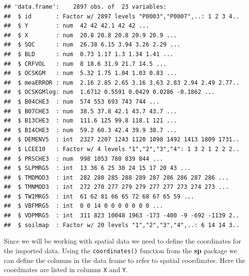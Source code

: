 \documentclass[10pt,b5paper,]{book}
\newenvironment{Shaded}{\begin{snugshade}}{\end{snugshade}}
\newcommand{\CommentTok}[1]{\textcolor[rgb]{0.56,0.35,0.01}{\textit{#1}}}
\newcommand{\KeywordTok}[1]{\textcolor[rgb]{0.13,0.29,0.53}{\textbf{#1}}}
\newcommand{\NormalTok}[1]{#1}
\newcommand{\OperatorTok}[1]{\textcolor[rgb]{0.81,0.36,0.00}{\textbf{#1}}}
\newcommand{\StringTok}[1]{\textcolor[rgb]{0.31,0.60,0.02}{#1}}
\theoremstyle{definition}
\theoremstyle{definition}
\theoremstyle{definition}
\theoremstyle{remark}
\begin{document}
\begin{Shaded}
\end{Shaded}

\begin{verbatim}
## 'data.frame':    2897 obs. of  23 variables:
##  $ id       : Factor w/ 2897 levels "P0003","P0007",..: 1 2 3 4..
##  $ Y        : num  42 42 42.1 42 42 ...
##  $ X        : num  20.8 20.8 20.8 20.9 20.9 ...
##  $ SOC      : num  26.38 6.15 3.94 3.26 2.29 ...
##  $ BLD      : num  0.73 1.17 1.3 1.34 1.41 ...
##  $ CRFVOL   : num  8 18.6 31.9 21.7 14.5 ...
##  $ OCSKGM   : num  5.32 1.75 1.04 1.03 0.83 ...
##  $ meaERROR : num  2.16 2.85 2.65 3.16 3.63 2.83 2.94 2.49 2.77..
##  $ OCSKGMlog: num  1.6712 0.5591 0.0429 0.0286 -0.1862 ...
##  $ B04CHE3  : num  574 553 693 743 744 ...
##  $ B07CHE3  : num  38.5 37.8 42.1 43.7 43.7 ...
##  $ B13CHE3  : num  111.6 125 99.8 118.1 121 ...
##  $ B14CHE3  : num  59.2 60.3 42.4 39.9 38.7 ...
##  $ DEMENV5  : int  2327 2207 1243 1120 1098 1492 1413 1809 1731..
##  $ LCEE10   : Factor w/ 4 levels "1","2","3","4": 1 3 2 1 2 2 2..
##  $ PRSCHE3  : num  998 1053 780 839 844 ...
##  $ SLPMRG5  : int  13 36 6 25 30 24 15 17 20 43 ...
##  $ TMDMOD3  : int  282 280 285 288 289 287 286 286 287 286 ...
##  $ TMNMOD3  : int  272 270 277 279 279 277 277 273 274 273 ...
##  $ TWIMRG5  : int  61 62 81 66 65 72 68 67 65 59 ...
##  $ VBFMRG5  : int  0 0 14 0 0 0 0 0 0 0 ...
##  $ VDPMRG5  : int  311 823 10048 1963 -173 -400 -9 -692 -1139 2..
##  $ soilmap  : Factor w/ 20 levels "1","2","3","4",..: 6 14 14 3..
\end{verbatim}

Since we will be working with spatial data we need to define the
coordinates for the imported data. Using the \texttt{coordinates()}
function from the \textbf{sp} package we can define the columns in the
data frame to refer to spatial coordinates. Here the coordinates are
listed in columns \texttt{X} and \texttt{Y}.
\end{document}
